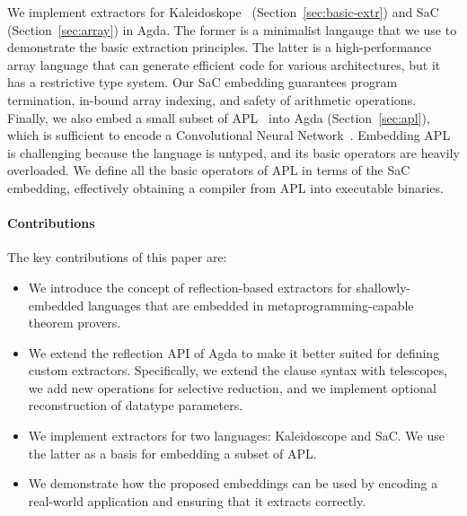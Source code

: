 \documentclass[acmsmall,review,anonymous]{acmart}\settopmatter{printfolios=true,printccs=false,printacmref=false}
\begin{document}
We implement extractors for Kaleidoskope~\cite{kaleidoscope} (Section~\ref{sec:basic-extr})
and SaC~\cite{sac} (Section~\ref{sec:array}) in Agda.
The former is a minimalist langauge that we use to demonstrate the basic
extraction principles.  The latter is a high-performance
array language that can generate efficient code for various architectures, but
it has a restrictive type system.  Our SaC embedding guarantees
program termination, in-bound array indexing, and safety of arithmetic operations.
%
Finally, we also embed a small subset of APL~\cite{APL} into Agda (Section~\ref{sec:apl}), which
is sufficient to encode a Convolutional Neural
Network~\cite{cnninapl}.  Embedding APL is challenging because the
language is untyped, and its basic operators are heavily overloaded.
We define all the basic operators of APL in terms of the SaC embedding,
effectively obtaining a compiler from APL into executable binaries.

\paragraph{Contributions}
The key contributions of this paper are:
\begin{itemize}
    \item We introduce the concept of reflection-based extractors
            for shallowly-embedded languages that are embedded
            in metaprogramming-capable theorem provers.
    \item We extend the reflection API of
            Agda to make it better suited for defining
            custom extractors. Specifically, we extend the clause
            syntax with telescopes, we add new operations for
            selective reduction, and we implement optional reconstruction
            of datatype parameters.
    \item We implement extractors for two languages: Kaleidoscope
            and SaC.  We use the latter as a basis for embedding
            a subset of APL.\@
    \item We demonstrate how the proposed embeddings can be used
            by encoding a real-world application and ensuring that
            it extracts correctly.
\end{itemize}

\end{document}
